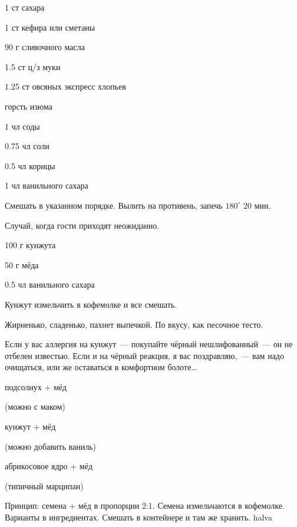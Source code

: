 \newpage
\pagestyle{empty}
\titlePM\label{sec:sweet}
\newpage
\pagestyle{chap}


{
\item 1 ст сахара
\item 1 ст кефира или сметаны
\item 90 г сливочного масла
\item 1.5 ст ц/з муки
\item 1.25 ст овсяных экспресс хлопьев %
\item горсть изюма
}{
\item 1 чл соды
\item 0.75 чл соли
\item 0.5 чл корицы
\item 1 чл ванильного сахара
}{
Смешать в указанном порядке. Вылить на противень, запечь $180^{\circ}$ 20 мин.
}{
\begin{advice}
\item Случай, когда гости приходят неожиданно.
\end{advice}}{}



{\label{cookies}
\item 100 г кунжута 
\item 50 г мёда
}{
\item 0.5 чл ванильного сахара
}{
Кунжут измельчить в кофемолке и все смешать.
}{
\begin{advice}
    \item  Жирненько, сладенько, пахнет выпечкой. По вкусу, как песочное тесто.
\item Если у вас аллергия на кунжут~--- покупайте чёрный нешлифованный~— он не отбелен известью. Если и на чёрный реакция, я вас поздравляю,~— вам надо очищаться, или же оставаться в комфортном болоте\ldots

\end{advice}}{}



{


\item подсолнух + мёд

    (можно с маком)
\item кунжут + мёд 

    (можно добавить ваниль)
\item абрикосовое ядро + мёд 

    (типичный марципан)

}{%
\item[]
}{
Принцип: семена + мёд в пропорции 2:1. Семена измельчаются в кофемолке. Варианты в ингредиентах.
Смешать в контейнере и там же хранить.
}{}{halva}



